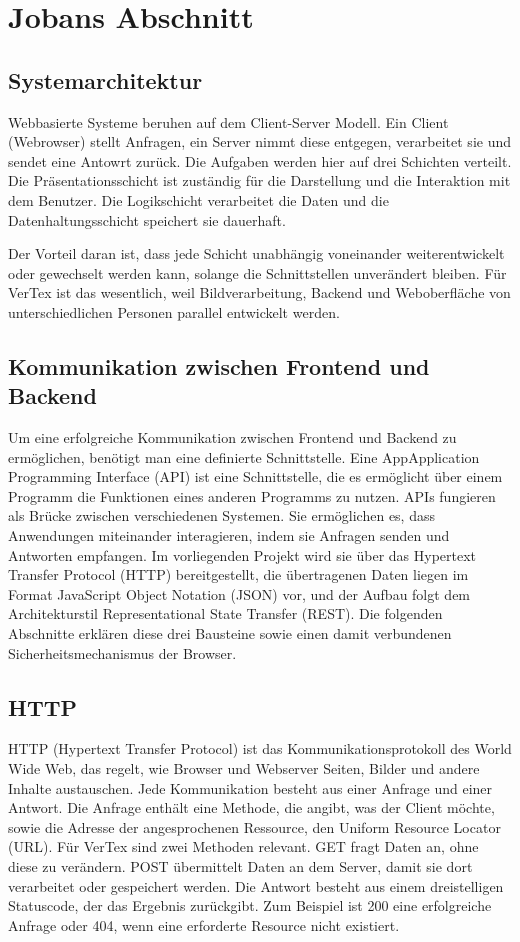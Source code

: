 \section{Jobans Abschnitt}



\subsection{Systemarchitektur}
\label{sec:systemarchitektur}
Webbasierte Systeme beruhen auf dem Client-Server Modell. Ein Client (Webrowser)
stellt Anfragen, ein Server nimmt diese entgegen, verarbeitet sie und sendet eine Antowrt zurück. 
Die Aufgaben werden hier auf drei Schichten verteilt. Die Präsentationsschicht
ist zuständig für die Darstellung und die Interaktion mit dem Benutzer. Die Logikschicht verarbeitet die Daten
und die Datenhaltungsschicht speichert sie dauerhaft. 

Der Vorteil daran ist, dass jede Schicht unabhängig voneinander weiterentwickelt oder gewechselt werden kann,
solange die Schnittstellen unverändert bleiben. Für VerTex ist das
wesentlich, weil Bildverarbeitung, Backend und Weboberfläche von
unterschiedlichen Personen parallel entwickelt werden.


\subsection{Kommunikation zwischen Frontend und Backend}
Um eine erfolgreiche Kommunikation zwischen Frontend und Backend zu ermöglichen, 
benötigt man eine definierte Schnittstelle. Eine AppApplication
Programming Interface (API) ist eine Schnittstelle, die es ermöglicht über einem Programm
die Funktionen eines anderen Programms zu nutzen.
APIs fungieren als Brücke zwischen verschiedenen Systemen. 
Sie ermöglichen es, dass Anwendungen miteinander interagieren, indem sie Anfragen senden und Antworten empfangen.
 Im vorliegenden Projekt wird sie über
das Hypertext Transfer Protocol (HTTP) bereitgestellt, die übertragenen Daten
liegen im Format JavaScript Object Notation (JSON) vor, und der Aufbau folgt
dem Architekturstil Representational State Transfer (REST). Die folgenden
Abschnitte erklären diese drei Bausteine sowie einen damit verbundenen
Sicherheitsmechanismus der Browser.

\subsection{HTTP}
HTTP (Hypertext Transfer Protocol) ist das Kommunikationsprotokoll des World Wide Web, 
das regelt, wie Browser und Webserver Seiten, Bilder und andere Inhalte austauschen.
Jede Kommunikation
besteht aus einer Anfrage und einer Antwort. Die Anfrage enthält eine Methode,
die angibt, was der Client möchte, sowie die Adresse der angesprochenen
Ressource, den Uniform Resource Locator (URL). Für VerTex sind zwei Methoden relevant. 
GET fragt Daten an, ohne diese zu verändern. POST übermittelt Daten an dem Server, 
damit sie dort verarbeitet oder gespeichert werden. Die Antwort besteht aus einem dreistelligen Statuscode,
 der das Ergebnis zurückgibt. Zum Beispiel ist 200 eine erfolgreiche Anfrage
 oder 404, wenn eine erforderte Resource nicht existiert. 

